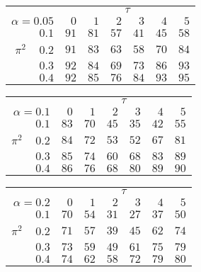 \begin{tabular}{r|rrrrrr}
\hline\hline
 &\multicolumn{6}{c}{$\tau$} \\ 
 $\alpha = 0.05$ & $0$ & $1$ & $2$ & $3$ & $4$ & $5$ \\ 
 \hline$0.1$ & $91$ & $81$ & $57$ & $41$ & $45$ & $58$\\ 
$\pi^2\;\;\;$ $0.2$ & $91$ & $83$ & $63$ & $58$ & $70$ & $84$\\ 
$0.3$ & $92$ & $84$ & $69$ & $73$ & $86$ & $93$\\ 
$0.4$ & $92$ & $85$ & $76$ & $84$ & $93$ & $95$\\ 
 \hline 
 \end{tabular}
 
 \vspace{2em} 
 
\begin{tabular}{r|rrrrrr}
\hline\hline
 &\multicolumn{6}{c}{$\tau$} \\ 
 $\alpha = 0.1$ & $0$ & $1$ & $2$ & $3$ & $4$ & $5$ \\ 
 \hline$0.1$ & $83$ & $70$ & $45$ & $35$ & $42$ & $55$\\ 
$\pi^2\;\;\;$ $0.2$ & $84$ & $72$ & $53$ & $52$ & $67$ & $81$\\ 
$0.3$ & $85$ & $74$ & $60$ & $68$ & $83$ & $89$\\ 
$0.4$ & $86$ & $76$ & $68$ & $80$ & $89$ & $90$\\ 
 \hline 
 \end{tabular}
 
 \vspace{2em} 
 
\begin{tabular}{r|rrrrrr}
\hline\hline
 &\multicolumn{6}{c}{$\tau$} \\ 
 $\alpha = 0.2$ & $0$ & $1$ & $2$ & $3$ & $4$ & $5$ \\ 
 \hline$0.1$ & $70$ & $54$ & $31$ & $27$ & $37$ & $50$\\ 
$\pi^2\;\;\;$ $0.2$ & $71$ & $57$ & $39$ & $45$ & $62$ & $74$\\ 
$0.3$ & $73$ & $59$ & $49$ & $61$ & $75$ & $79$\\ 
$0.4$ & $74$ & $62$ & $58$ & $72$ & $79$ & $80$\\ 
 \hline 
 \end{tabular}
